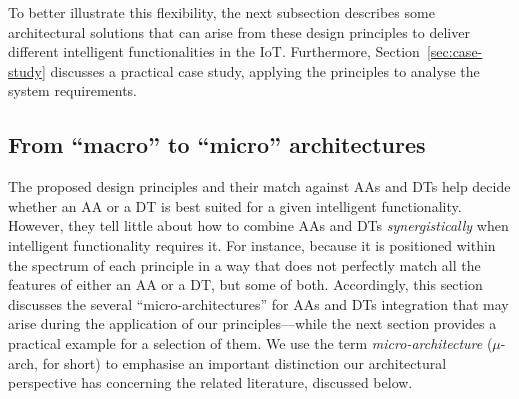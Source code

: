 To better illustrate this flexibility, the next subsection describes some architectural solutions that can arise from these design principles to deliver different intelligent functionalities in the IoT. 
Furthermore, Section~\ref{sec:case-study} discusses a practical case study, applying the principles to analyse the system requirements.


\subsection{From ``macro'' to ``micro'' architectures}
\label{ssec:multi-layer}



The proposed design principles and their match against AAs and DTs help decide whether an AA or a DT is best suited for a given intelligent functionality. 
However, they tell little about how to combine AAs and DTs \emph{synergistically} when intelligent functionality requires it. 
For instance, because it is positioned within the spectrum of each principle in a way that does not perfectly match all the features of either an AA or a DT, but some of both. 
Accordingly, this section discusses the several ``micro-architectures'' for AAs and DTs integration that may arise during the application of our principles---while the next section provides a practical example for a selection of them. 
We use the term \emph{micro-architecture} ($\mu$-arch, for short) to emphasise an important distinction our architectural perspective has concerning the related literature, discussed below.

